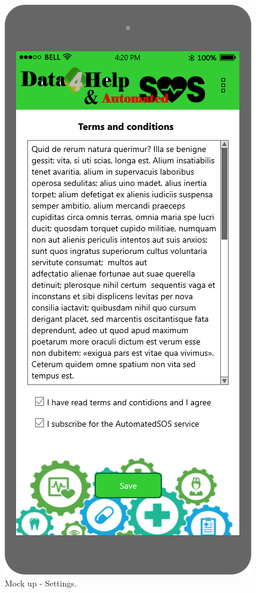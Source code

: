 \begin{figure}
\begin{minipage}[b]{0.25\textwidth}
    		\caption{Mock up - Settings.\\}
	\end{minipage}
	\hfill
	\begin{minipage}[b]{0.25\textwidth}
    		\includegraphics[width=\textwidth]{./pictures/terms_and_conditions.png}

\end{minipage}
\end{figure}
